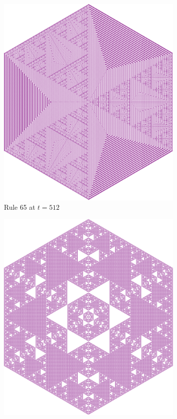 \documentclass{article}
\begin{document}
\begin{figure}[H]
\begin{subfigure}[b]{0.46\textwidth}
        \includegraphics[width=\textwidth]{graphics/behavior/fractals/rule-65-time-512-OneAlive.pdf}
        \caption{Rule 65 at $t=512$}
        \label{fig:rule-65-time-512-OneAlive}
    \end{subfigure}
    \hspace{0.06\textwidth}
    \begin{subfigure}[b]{0.46\textwidth}
        \centering
        \includegraphics[width=\textwidth]{graphics/behavior/fractals/rule-106-time-510-OneAlive.pdf}

\end{subfigure}
\end{figure}
\end{document}
